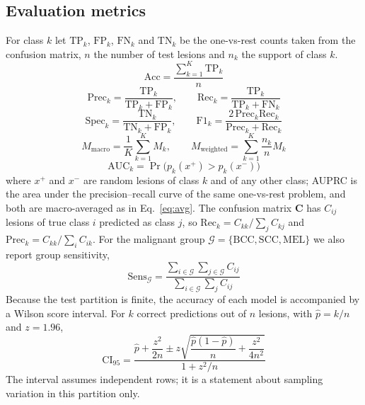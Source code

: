 \documentclass[conference]{IEEEtran}
\begin{document}
\subsection{Evaluation metrics}
For class $k$ let $\mathrm{TP}_k$, $\mathrm{FP}_k$, $\mathrm{FN}_k$ and $\mathrm{TN}_k$ be the one-vs-rest counts taken from the confusion matrix, $n$ the number of test lesions and $n_k$ the support of class $k$.
\begin{equation}
\mathrm{Acc}=\frac{\sum_{k=1}^{K}\mathrm{TP}_k}{n}
\label{eq:acc}
\end{equation}
\begin{equation}
\mathrm{Prec}_k=\frac{\mathrm{TP}_k}{\mathrm{TP}_k+\mathrm{FP}_k},\qquad
\mathrm{Rec}_k=\frac{\mathrm{TP}_k}{\mathrm{TP}_k+\mathrm{FN}_k}
\label{eq:prec}
\end{equation}
\begin{equation}
\mathrm{Spec}_k=\frac{\mathrm{TN}_k}{\mathrm{TN}_k+\mathrm{FP}_k},\qquad
\mathrm{F1}_k=\frac{2\,\mathrm{Prec}_k\mathrm{Rec}_k}{\mathrm{Prec}_k+\mathrm{Rec}_k}
\label{eq:spec}
\end{equation}
\begin{equation}
M_{\mathrm{macro}}=\frac1K\sum_{k=1}^{K}M_k,\qquad
M_{\mathrm{weighted}}=\sum_{k=1}^{K}\frac{n_k}{n}M_k
\label{eq:avg}
\end{equation}
\begin{equation}
\mathrm{AUC}_k=\Pr\bigl(p_k(x^{+})>p_k(x^{-})\bigr)
\label{eq:auc}
\end{equation}
where $x^{+}$ and $x^{-}$ are random lesions of class $k$ and of any other class; AUPRC is the area under the precision--recall curve of the same one-vs-rest problem, and both are macro-averaged as in Eq.~\eqref{eq:avg}. The confusion matrix $\mathbf C$ has $C_{ij}$ lesions of true class $i$ predicted as class $j$, so $\mathrm{Rec}_k=C_{kk}/\sum_j C_{kj}$ and $\mathrm{Prec}_k=C_{kk}/\sum_i C_{ik}$. For the malignant group $\mathcal G=\{\mathrm{BCC},\mathrm{SCC},\mathrm{MEL}\}$ we also report group sensitivity,
\begin{equation}
\mathrm{Sens}_{\mathcal G}=\frac{\sum_{i\in\mathcal G}\sum_{j\in\mathcal G}C_{ij}}{\sum_{i\in\mathcal G}\sum_{j}C_{ij}}
\label{eq:gsens}
\end{equation}
Because the test partition is finite, the accuracy of each model is accompanied by a Wilson score interval. For $k$ correct predictions out of $n$ lesions, with $\hat p=k/n$ and $z=1.96$,
\begin{equation}
\mathrm{CI}_{95}=\frac{\hat p+\dfrac{z^{2}}{2n}\pm z\sqrt{\dfrac{\hat p(1-\hat p)}{n}+\dfrac{z^{2}}{4n^{2}}}}{1+z^{2}/n}
\label{eq:wilson}
\end{equation}
The interval assumes independent rows; it is a statement about sampling variation in this partition only.
\end{document}
